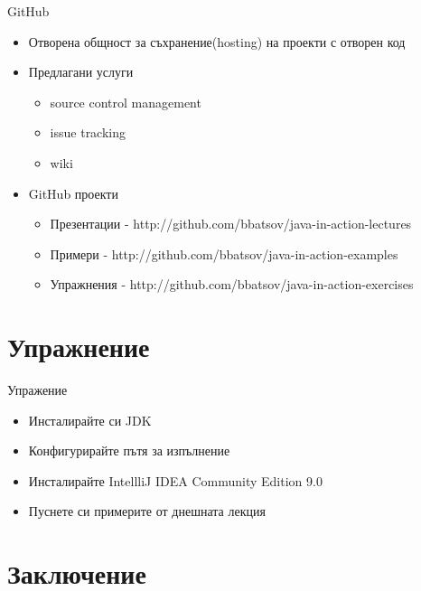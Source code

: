 \documentclass{beamer}
\begin{document}
\begin{frame}{GitHub}
  \transdissolve
  \begin{itemize}
    \item Отворена общност за съхранение(hosting) на
    проекти с отворен код
    \item Предлагани услуги
      \begin{itemize}
        \item source control management
        \item issue tracking
        \item wiki
      \end{itemize}
    \item GitHub проекти
      \begin{itemize}
      \item Презентации -
        http://github.com/bbatsov/java-in-action-lectures 
        \item Примери -
          http://github.com/bbatsov/java-in-action-examples
        \item Упражнения -
          http://github.com/bbatsov/java-in-action-exercises
      \end{itemize}
  \end{itemize}
\end{frame}

\section{Упражнение}
\begin{frame}{Упражение}
  \transdissolve  
  \begin{itemize}
    \item Инсталирайте си JDK
    \item Конфигурирайте пътя за изпълнение
    \item Инсталирайте IntellliJ IDEA Community Edition 9.0
    \item Пуснете си примерите от днешната
    лекция
  \end{itemize}
\end{frame}

\section*{Заключение}
\end{document}

